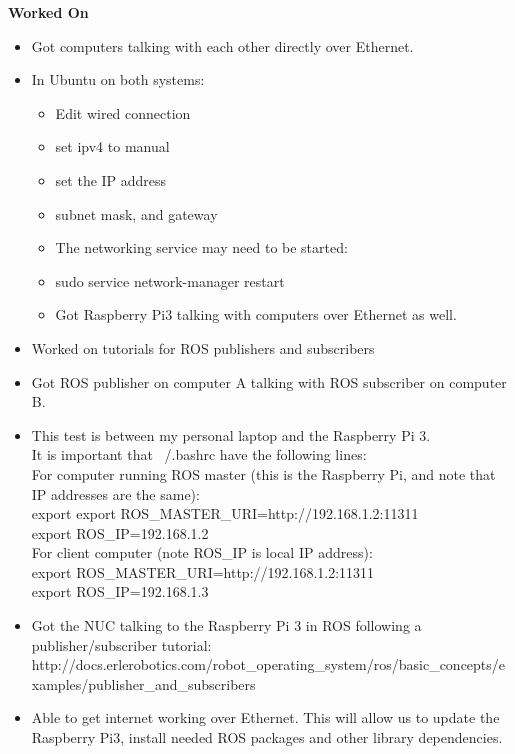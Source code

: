 \documentclass[compsoc,draftclsnofoot,onecolumn,10pt]{IEEEtran}
\begin{document}
\textbf{Worked On}
\begin{itemize}
    \item Got computers talking with each other directly over Ethernet.
    \item In Ubuntu on both systems:
    \begin{itemize}
        \item Edit wired connection
        \item set ipv4 to manual
        \item set the IP address
        \item subnet mask, and gateway
        \item The networking service may need to be started:
        \item sudo service network-manager restart
        \item Got Raspberry Pi3 talking with computers over Ethernet as well.
    \end{itemize}
    \item Worked on tutorials for ROS publishers and subscribers
    \item Got ROS publisher on computer A talking with ROS subscriber on computer B.
    \item This test is between my personal laptop and the Raspberry Pi 3.\\
        It is important that ~/.bashrc have the following lines:\\
        For computer running ROS master (this is the Raspberry Pi, and note that IP addresses are the same):\\
        export export ROS\_MASTER\_URI=http://192.168.1.2:11311\\
        export ROS\_IP=192.168.1.2\\
        For client computer (note ROS\_IP is local IP address):\\
        export ROS\_MASTER\_URI=http://192.168.1.2:11311\\
        export ROS\_IP=192.168.1.3\\
    \item Got the NUC talking to the Raspberry Pi 3 in ROS following a publisher/subscriber tutorial:\\
    http://docs.erlerobotics.com/robot\_operating\_system/ros/basic\_concepts/examples/publisher\_and\_subscribers
    \item Able to get internet working over Ethernet. This will allow us to update the Raspberry Pi3, install needed ROS packages and other library dependencies.
\end{itemize}
\end{document}
